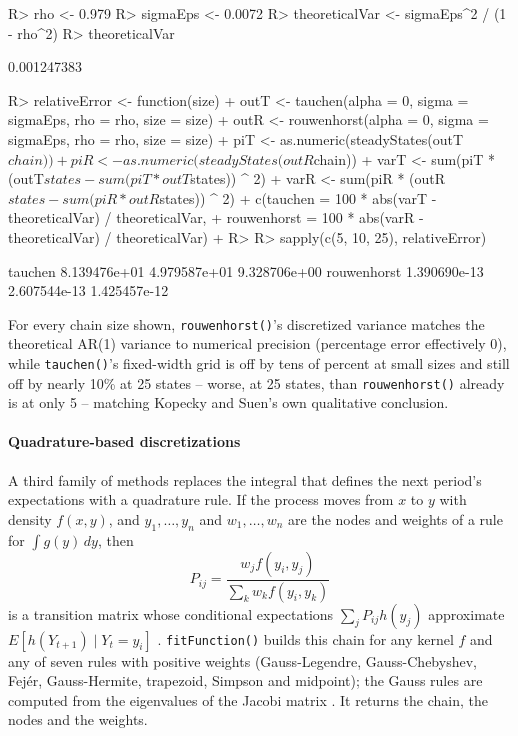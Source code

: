 \documentclass[
  nojss]{jss}
\begin{document}
\begin{CodeChunk}
\begin{CodeInput}
R> rho <- 0.979
R> sigmaEps <- 0.0072
R> theoreticalVar <- sigmaEps^2 / (1 - rho^2)
R> theoreticalVar
\end{CodeInput}
\begin{CodeOutput}
[1] 0.001247383
\end{CodeOutput}
\begin{CodeInput}
R> relativeError <- function(size) {
+   outT <- tauchen(alpha = 0, sigma = sigmaEps, rho = rho, size = size)
+   outR <- rouwenhorst(alpha = 0, sigma = sigmaEps, rho = rho, size = size)
+   piT <- as.numeric(steadyStates(outT$chain))
+   piR <- as.numeric(steadyStates(outR$chain))
+   varT <- sum(piT * (outT$states - sum(piT * outT$states)) ^ 2)
+   varR <- sum(piR * (outR$states - sum(piR * outR$states)) ^ 2)
+   c(tauchen = 100 * abs(varT - theoreticalVar) / theoreticalVar,
+     rouwenhorst = 100 * abs(varR - theoreticalVar) / theoreticalVar)
+ }
R> 
R> sapply(c(5, 10, 25), relativeError)
\end{CodeInput}
\begin{CodeOutput}
                    [,1]         [,2]         [,3]
tauchen     8.139476e+01 4.979587e+01 9.328706e+00
rouwenhorst 1.390690e-13 2.607544e-13 1.425457e-12
\end{CodeOutput}
\end{CodeChunk}

For every chain size shown, \texttt{rouwenhorst()}'s discretized variance matches
the theoretical AR(1) variance to numerical precision (percentage error
effectively 0), while \texttt{tauchen()}'s fixed-width grid is off by tens of
percent at small sizes and still off by nearly 10\% at 25 states -- worse,
at 25 states, than \texttt{rouwenhorst()} already is at only 5 -- matching Kopecky
and Suen's own qualitative conclusion.

\paragraph{Quadrature-based discretizations}\label{quadrature-based-discretizations}

A third family of methods replaces the integral that defines the next
period's expectations with a quadrature rule. If the process moves from \(x\)
to \(y\) with density \(f(x, y)\), and \(y_1, \ldots, y_n\) and \(w_1, \ldots, w_n\)
are the nodes and weights of a rule for \(\int g(y)\,dy\), then
\[
P_{ij} = \frac{w_j f(y_i, y_j)}{\sum_k w_k f(y_i, y_k)}
\]
is a transition matrix whose conditional expectations
\(\sum_j P_{ij} h(y_j)\) approximate \(E[h(Y_{t+1}) \mid Y_t = y_i]\)
\citep{tauchenHussey1991}. \texttt{fitFunction()} builds this chain for any
kernel \(f\) and any of seven rules with positive weights (Gauss-Legendre,
Gauss-Chebyshev, Fejér, Gauss-Hermite, trapezoid, Simpson and midpoint);
the Gauss rules are computed from the eigenvalues of the Jacobi matrix
\citep{golubWelsch1969}. It returns the chain, the nodes and the weights.
\end{document}
